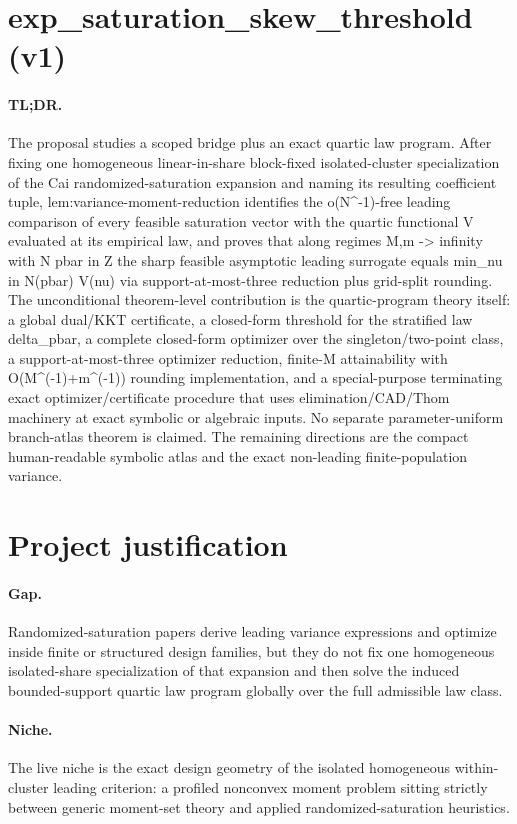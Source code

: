 \documentclass{article}
\begin{document}
\section*{exp_saturation_skew_threshold (v1)}

\paragraph{TL;DR.} The proposal studies a scoped bridge plus an exact quartic law program. After fixing one homogeneous linear-in-share block-fixed isolated-cluster specialization of the Cai randomized-saturation expansion and naming its resulting coefficient tuple, lem:variance-moment-reduction identifies the o(N^-1)-free leading comparison of every feasible saturation vector with the quartic functional V evaluated at its empirical law, and proves that along regimes M,m -> infinity with N pbar in Z the sharp feasible asymptotic leading surrogate equals min_{nu in N(pbar)} V(nu) via support-at-most-three reduction plus grid-split rounding. The unconditional theorem-level contribution is the quartic-program theory itself: a global dual/KKT certificate, a closed-form threshold for the stratified law delta_pbar, a complete closed-form optimizer over the singleton/two-point class, a support-at-most-three optimizer reduction, finite-M attainability with O(M^(-1)+m^(-1)) rounding implementation, and a special-purpose terminating exact optimizer/certificate procedure that uses elimination/CAD/Thom machinery at exact symbolic or algebraic inputs. No separate parameter-uniform branch-atlas theorem is claimed. The remaining directions are the compact human-readable symbolic atlas and the exact non-leading finite-population variance.

\section{Project justification}

\paragraph{Gap.} Randomized-saturation papers derive leading variance expressions and optimize inside finite or structured design families, but they do not fix one homogeneous isolated-share specialization of that expansion and then solve the induced bounded-support quartic law program globally over the full admissible law class.

\paragraph{Niche.} The live niche is the exact design geometry of the isolated homogeneous within-cluster leading criterion: a profiled nonconvex moment problem sitting strictly between generic moment-set theory and applied randomized-saturation heuristics.
\end{document}
